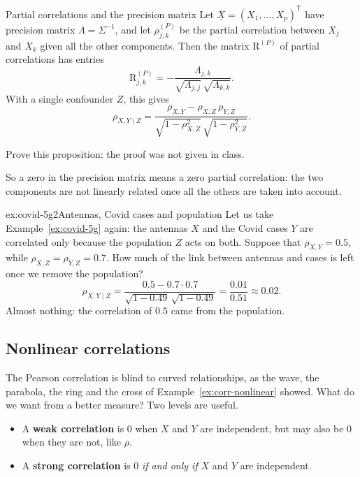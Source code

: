 \documentclass[a4paper,12pt,oneside]{report}
\begin{document}
\begin{framedprop}{Partial correlations and the precision matrix}\label{prop:partial-precision}
Let $\underline{X}=(X_1,\ldots,X_p)^{\mathsf T}$ have precision matrix
$\Lambda=\Sigma^{-1}$, and let $\rho^{(P)}_{j,k}$ be the partial correlation
between $X_j$ and $X_k$ given all the other components. Then the matrix
$\mathrm{R}^{(P)}$ of partial correlations has entries
\[
\mathrm{R}^{(P)}_{j,k}=-\frac{\Lambda_{j,k}}{\sqrt{\Lambda_{j,j}}\,\sqrt{\Lambda_{k,k}}}.
\]
With a single confounder $Z$, this gives
\[
\rho_{X,Y\mid Z}=\frac{\rho_{X,Y}-\rho_{X,Z}\,\rho_{Y,Z}}{\sqrt{1-\rho_{X,Z}^2}\,\sqrt{1-\rho_{Y,Z}^2}}.
\]
\end{framedprop}

\begin{todobox}
Prove this proposition: the proof was not given in class.
\end{todobox}

So a zero in the precision matrix means a zero partial correlation: the
two components are not linearly related once all the others are taken
into account.

\begin{framedexamplepart}{ex:covid-5g}{2}{Antennas, Covid cases and population}
Let us take Example~\ref{ex:covid-5g} again: the antennas $X$ and the
Covid cases $Y$ are correlated only because the population $Z$ acts on
both. Suppose that $\rho_{X,Y}=0.5$, while $\rho_{X,Z}=\rho_{Y,Z}=0.7$.
How much of the link between antennas and cases is left once we remove
the population?
\[
\rho_{X,Y\mid Z}=\frac{0.5-0.7\cdot0.7}{\sqrt{1-0.49}\,\sqrt{1-0.49}}
=\frac{0.01}{0.51}\approx0.02 .
\]
Almost nothing: the correlation of $0.5$ came from the population.
\end{framedexamplepart}

\subsection{Nonlinear correlations}\label{sec:nonlinear-correlation}

The Pearson correlation is blind to curved relationships, as the wave,
the parabola, the ring and the cross of
Example~\ref{ex:corr-nonlinear} showed. What do we want from a better
measure? Two levels are useful.
\begin{itemize}
\item A \textbf{weak correlation} is $0$ when $X$ and $Y$ are independent,
but may also be $0$ when they are not, like $\rho$.
\item A \textbf{strong correlation} is $0$ \emph{if and only if} $X$ and
$Y$ are independent.
\end{itemize}
\end{document}
